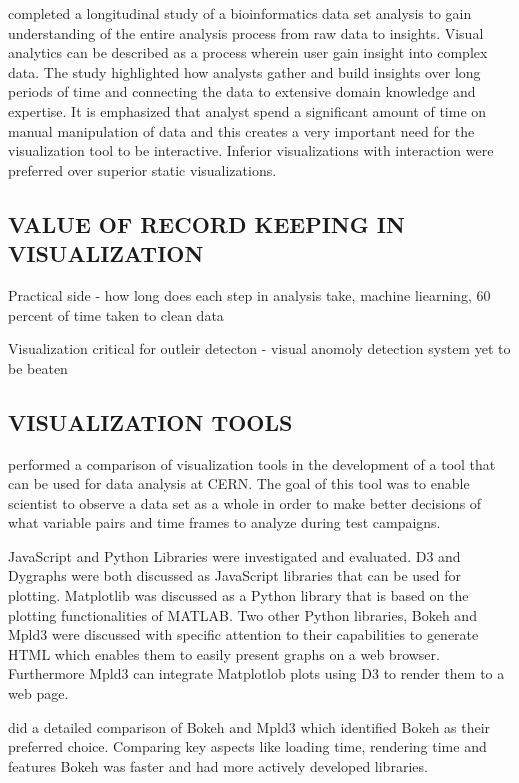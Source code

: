 \cite{saraiya2006insight} completed a longitudinal study of a bioinformatics data set analysis to gain understanding of the entire analysis process from raw data to insights. Visual analytics can be described as a process wherein user gain insight into complex data. The study highlighted how analysts gather and build insights over long periods of time and connecting the data to extensive domain knowledge and expertise. It is emphasized that analyst spend a significant amount of time on manual manipulation of data and this creates a very important need for the visualization tool to be interactive. Inferior visualizations with interaction were preferred over superior static visualizations.

\subsection{VALUE OF RECORD KEEPING IN VISUALIZATION}

Practical side - how long does each step in analysis take, machine liearning, 60 percent of time taken to clean data

Visualization critical for outleir detecton - visual anomoly detection system yet to be beaten

\subsection{VISUALIZATION TOOLS}

\cite{barnard2015usability} performed a comparison of visualization tools in the development of a tool that can be used for data analysis at CERN. The goal of this tool was to enable scientist to observe a data set as a whole in order to make better decisions of what variable pairs and time frames to analyze during test campaigns.

JavaScript and Python Libraries were investigated and evaluated. D3 and Dygraphs were both discussed as JavaScript libraries that can be used for plotting. Matplotlib was discussed as a Python library that is based on the plotting functionalities of MATLAB. Two other Python libraries, Bokeh and Mpld3 were discussed with specific attention to their capabilities to generate HTML which enables them to easily present graphs on a web browser. Furthermore Mpld3 can integrate Matplotlob plots using D3 to render them to a web page.

\cite{barnard2015usability} did a detailed comparison of Bokeh and Mpld3 which identified Bokeh as their preferred choice. Comparing key aspects like loading time, rendering time and features Bokeh was faster and had more actively developed libraries.

